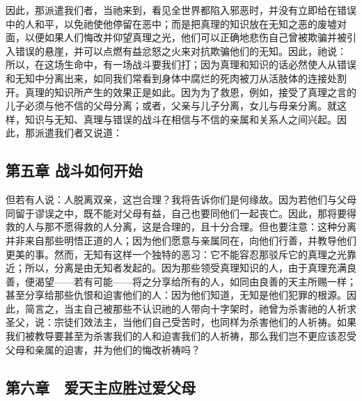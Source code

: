因此，那派遣我们者，当祂来到，看见全世界都陷入邪恶时，并没有立即给在错误中的人和平，以免祂使他停留在恶中；而是把真理的知识放在无知之恶的废墟对面，以便如果人们悔改并仰望真理之光，他们可以正确地悲伤自己曾被欺骗并被引入错误的悬崖，并可以点燃有益忿怒之火来对抗欺骗他们的无知。因此，祂说：  所以，在这场生命中，有一场战斗要我们打；因为真理和知识的话必然使人从错误和无知中分离出来，如同我们常看到身体中腐烂的死肉被刀从活肢体的连接处割开。真理的知识所产生的效果正是如此。因为为了救恩，例如，接受了真理之言的儿子必须与他不信的父母分离；或者，父亲与儿子分离，女儿与母亲分离。就这样，知识与无知、真理与错误的战斗在相信与不信的亲属和关系人之间兴起。因此，那派遣我们者又说道： \par


\subsection{第五章 战斗如何开始}

但若有人说：人脱离双亲，这岂合理？我将告诉你们是何缘故。因为若他们与父母同留于谬误之中，既不能对父母有益，自己也要同他们一起丧亡。因此，那将要得救的人与那不愿得救的人分离，这是合理的，且十分合理。但也要注意：这种分离并非来自那些明悟正道的人；因为他们愿意与亲属同在，向他们行善，并教导他们更美的事。然而，无知有这样一个独特的恶习：它不能容忍那驳斥它的真理之光靠近；所以，分离是由无知者发起的。因为那些领受真理知识的人，由于真理充满良善，便渴望——若有可能——将之分享给所有的人，如同由良善的天主所赐一样；甚至分享给那些仇恨和迫害他们的人：因为他们知道，无知是他们犯罪的根源。因此，简言之，当主自己被那些不认识祂的人带向十字架时，祂曾为杀害祂的人祈求圣父，说：宗徒们效法主，当他们自己受苦时，也同样为杀害他们的人祈祷。如果我们被教导要甚至为杀害我们的人和迫害我们的人祈祷，那么我们岂不更应该忍受父母和亲属的迫害，并为他们的悔改祈祷吗？\par


\subsection{第六章　爱天主应胜过爱父母}

